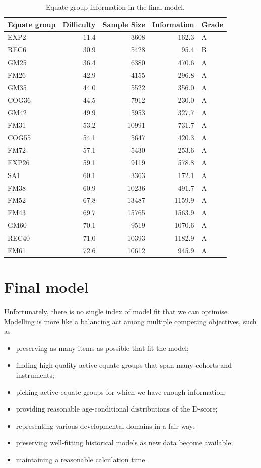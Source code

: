 \documentclass[
]{book}
\providecommand{\tightlist}{%
  \setlength{\itemsep}{0pt}\setlength{\parskip}{0pt}}
\begin{document}
\begin{table}

\caption{\label{tab:equateinfo}Equate group information in the final model.}
\centering
\begin{tabular}[t]{lrrrl}
\toprule
Equate group & Difficulty & Sample Size & Information & Grade\\
\midrule
EXP2 & 11.4 & 3608 & 162.3 & A\\
REC6 & 30.9 & 5428 & 95.4 & B\\
GM25 & 36.4 & 6380 & 470.6 & A\\
FM26 & 42.9 & 4155 & 296.8 & A\\
GM35 & 44.0 & 5522 & 356.0 & A\\
\addlinespace
COG36 & 44.5 & 7912 & 230.0 & A\\
GM42 & 49.9 & 5953 & 327.7 & A\\
FM31 & 53.2 & 10991 & 731.7 & A\\
COG55 & 54.1 & 5647 & 420.3 & A\\
FM72 & 57.1 & 5430 & 253.6 & A\\
\addlinespace
EXP26 & 59.1 & 9119 & 578.8 & A\\
SA1 & 60.1 & 3363 & 172.1 & A\\
FM38 & 60.9 & 10236 & 491.7 & A\\
FM52 & 67.8 & 13487 & 1159.9 & A\\
FM43 & 69.7 & 15765 & 1563.9 & A\\
\addlinespace
GM60 & 70.1 & 9519 & 1070.6 & A\\
REC40 & 71.0 & 10393 & 1182.9 & A\\
FM61 & 72.6 & 10612 & 945.9 & A\\
\bottomrule
\end{tabular}
\end{table}

\hypertarget{sec:finalmodel}{%
\section{Final model}\label{sec:finalmodel}}

Unfortunately, there is no single index of model fit that we can optimise. Modelling is more like a balancing act among multiple competing objectives, such as

\begin{itemize}
\tightlist
\item
  preserving as many items as possible that fit the model;
\item
  finding high-quality active equate groups that span many cohorts and instruments;
\item
  picking active equate groups for which we have enough information;
\item
  providing reasonable age-conditional distributions of the D-score;
\item
  representing various developmental domains in a fair way;
\item
  preserving well-fitting historical models as new data become available;
\item
  maintaining a reasonable calculation time.
\end{itemize}
\end{document}
